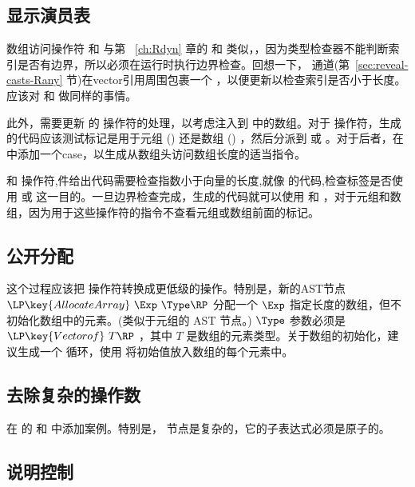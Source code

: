 \documentclass[11pt]{book}
\begin{document}
\subsection{显示演员表}

数组访问操作符  和
 与第 ~\ref{ch:Rdyn} 章的  和
 类似，，因为类型检查器不能判断索引是否有边界，所以必须在运行时执行边界检查。回想一下，
 通道(第~\ref{sec:reveal-casts-Rany} 节)在vector引用周围包裹一个  ，以便更新以检查索引是否小于长度。应该对 和  做同样的事情。

此外，需要更新  的  操作符的处理，以考虑注入到  中的数组。对于  操作符，生成的代码应该测试标记是用于元组 ()
还是数组 () ，然后分派到
 或  。对于后者，在  中添加一个case，以生成从数组头访问数组长度的适当指令。

  和  操作符,件给出代码需要检查指数小于向量的长度,就像  的代码,检查标签是否使用  或
 这一目的。一旦边界检查完成，生成的代码就可以使用  和
 ，对于元组和数组，因为用于这些操作符的指令不查看元组或数组前面的标记。
\subsection{公开分配}

这个过程应该把  操作符转换成更低级的操作。特别是，新的AST节点
$\LP\key{AllocateArray}~\Exp~\Type\RP$ 分配一个 $\Exp$ 指定长度的数组，但不初始化数组中的元素。(类似于元组的  AST 节点。)
 $\Type$ 参数必须是 $\LP\key{Vectorof}~T\RP$ ，其中 $T$ 是数组的元素类型。关于数组的初始化，建议生成一个  循环，使用
 将初始值放入数组的每个元素中。

\subsection{去除复杂的操作数}

在  的  和  中添加案例。特别是，  节点是复杂的，它的子表达式必须是原子的。

\subsection{说明控制}
\end{document}
